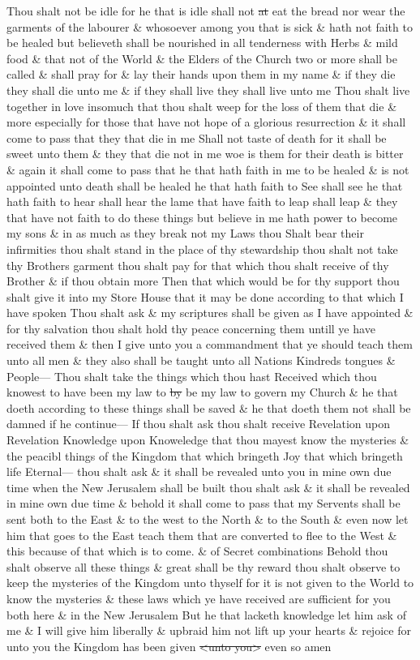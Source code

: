 				Thou shalt not be idle for he that is idle shall not \sout{at} eat the bread nor wear the garments of the labourer \& whosoever among you that is sick \& hath not faith to be healed but believeth shall be nourished in all tenderness with Herbs \& mild food \& that not of the World \& the Elders of the Church two or more shall be called \& shall pray for \& lay their hands upon them in my name \& if they die they shall die unto me \& if they shall live they shall live unto me Thou shalt live together in love insomuch that thou shalt weep for the loss of them that die \& more especially for those that have not hope of a glorious resurrection \& it shall come to pass that they that die in me Shall not taste of death for it shall be sweet unto them \& they that die not in me woe is them for their death is bitter \& again it shall come to pass that he that hath faith in me to be healed \& is not appointed unto death shall be healed he that hath faith to See shall see he that hath faith to hear shall hear the lame that have faith to leap shall leap \& they that have not faith to do these things but believe in me hath power to become my sons \& in as much as they break not my Laws thou Shalt bear their infirmities thou shalt stand in the place of thy stewardship thou shalt not take thy Brothers garment thou shalt pay for that which thou shalt receive of thy Brother \& if thou obtain more Then that which would be for thy support thou shalt give it into my Store House that it may be done according to that which I have spoken Thou shalt ask \& my scriptures shall be given as I have appointed \& for thy salvation thou shalt hold thy peace concerning them untill ye have received them \& then I give unto you a commandment that ye should teach them unto all men \& they also shall be taught unto all Nations Kindreds tongues \& People--- Thou shalt take the things which thou hast Received which thou knowest to have been my law to \sout{by} be my law to govern my Church \& he that doeth according to these things shall be saved \& he that doeth them not shall be damned if he continue--- If thou shalt ask thou shalt receive Revelation upon Revelation Knowledge upon Knoweledge that thou mayest know the mysteries \& the peacibl things of the Kingdom that which bringeth Joy that which bringeth life Eternal--- thou shalt ask \& it shall be revealed unto you in mine own due time when the New Jerusalem shall be built thou shalt ask \& it shall be revealed in mine own due time \& behold it shall come to pass that my Servents shall be sent both to the East \& to the west to the North \& to the South \& even now let him that goes to the East teach them that are converted to flee to the West \& this because of that which is to come. \& of Secret combinations Behold thou shalt observe all these things \& great shall be thy reward thou shalt observe to keep the mysteries of the Kingdom unto thyself for it is not given to the World to know the mysteries \& these laws which ye have received are sufficient for you both here \& in the New Jerusalem But he that lacketh knowledge let him ask of me \& I will give him liberally \& upbraid him not lift up your hearts \& rejoice for unto you the Kingdom has been given \sout{<unto you>} even so amen

